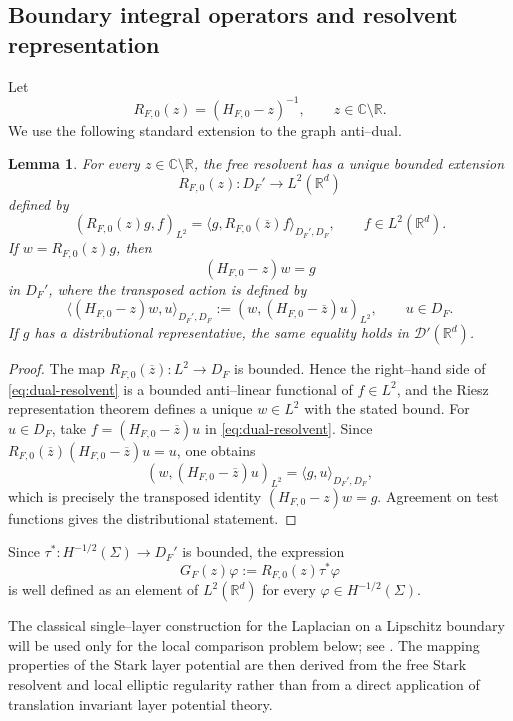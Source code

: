 \documentclass[a4paper,11pt]{article}
\numberwithin{equation}{section}
\newtheorem{lem}{Lemma}[section]
\theoremstyle{remark}
\theoremstyle{definition}
\theoremstyle{remark}
\begin{document}
\subsection{Boundary integral operators and resolvent representation}

Let
$$
R_{F,0}(z)=(H_{F,0}-z)^{-1},
\qquad z\in\mathbb C\setminus\mathbb R.
$$
We use the following standard extension to the graph anti--dual.

\begin{lem}\label{lem:dual-resolvent}
For every $z\in\mathbb C\setminus\mathbb R$, the free resolvent has a unique bounded extension
$$
R_{F,0}(z):D_F'\to L^2(\mathbb R^d)
$$
defined by
\begin{equation}\label{eq:dual-resolvent}
(R_{F,0}(z)g,f)_{L^2}
=
\langle g,R_{F,0}(\overline z)f\rangle_{D_F',D_F},
\qquad f\in L^2(\mathbb R^d).
\end{equation}
If $w=R_{F,0}(z)g$, then
$$
(H_{F,0}-z)w=g
$$
in $D_F'$, where the transposed action is defined by
$$
\bigl\langle(H_{F,0}-z)w,u\bigr\rangle_{D_F',D_F}
:=
(w,(H_{F,0}-\overline z)u)_{L^2},
\qquad u\in D_F.
$$
If $g$ has a distributional representative, the same equality holds in $\mathcal D'(\mathbb R^d)$.
\end{lem}

\begin{proof}
The map $R_{F,0}(\overline z):L^2\to D_F$ is bounded.
Hence the right--hand side of \eqref{eq:dual-resolvent} is a bounded anti--linear functional of $f\in L^2$, and the Riesz representation theorem defines a unique $w\in L^2$ with the stated bound.
For $u\in D_F$, take $f=(H_{F,0}-\overline z)u$ in \eqref{eq:dual-resolvent}.
Since $R_{F,0}(\overline z)(H_{F,0}-\overline z)u=u$, one obtains
$$
(w,(H_{F,0}-\overline z)u)_{L^2}
=\langle g,u\rangle_{D_F',D_F},
$$
which is precisely the transposed identity $(H_{F,0}-z)w=g$.
Agreement on test functions gives the distributional statement.
\end{proof}

Since $\tau^*:H^{-1/2}(\Sigma)\to D_F'$ is bounded, the expression
$$
G_F(z)\varphi:=R_{F,0}(z)\tau^*\varphi
$$
is well defined as an element of $L^2(\mathbb R^d)$ for every $\varphi\in H^{-1/2}(\Sigma)$.

The classical single--layer construction for the Laplacian on a Lipschitz
boundary will be used only for the local comparison problem below; see
\cite{Costabel1988,McLean2000,Verchota1984}.
The mapping properties of the Stark layer potential are then derived from the
free Stark resolvent and local elliptic regularity rather than from a direct
application of translation invariant layer potential theory.
\end{document}
